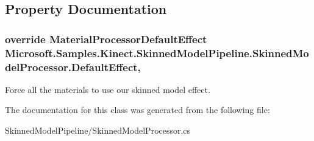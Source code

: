 \subsection{Property Documentation}
\hypertarget{class_microsoft_1_1_samples_1_1_kinect_1_1_skinned_model_pipeline_1_1_skinned_model_processor_a15f28361f1525eae7c96ddb05a290a2d}{
\subsubsection[{Default\+Effect}]{\setlength{\rightskip}{0pt plus 5cm}override Material\+Processor\+Default\+Effect Microsoft.\+Samples.\+Kinect.\+Skinned\+Model\+Pipeline.\+Skinned\+Model\+Processor.\+Default\+Effect\hspace{0.3cm}{\ttfamily [get]}, {\ttfamily [set]}}}\label{class_microsoft_1_1_samples_1_1_kinect_1_1_skinned_model_pipeline_1_1_skinned_model_processor_a15f28361f1525eae7c96ddb05a290a2d}


Force all the materials to use our skinned model effect. 



The documentation for this class was generated from the following file\+:\begin{DoxyCompactItemize}
\item 
Skinned\+Model\+Pipeline/Skinned\+Model\+Processor.\+cs\end{DoxyCompactItemize}
